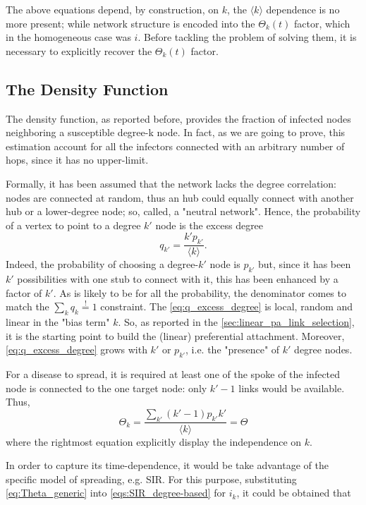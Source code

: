 \documentclass[a4paper,12pt,twoside]{book} %
\theoremstyle{definition}
\begin{document}
The above equations depend, by construction, on $k$, the $\langle k \rangle$ dependence is no more present; while network structure is encoded into the $\Theta_k(t)$ factor, which in the homogeneous case was $i$.
Before tackling the problem of solving them, it is necessary to explicitly recover the $\Theta_k(t)$ factor.

\subsection*{The Density Function}
The density function, as reported before, provides the fraction of infected nodes neighboring a susceptible degree-k node. In fact, as we are going to prove, this estimation account for all the infectors connected with an arbitrary number of hops, since it has no upper-limit. 

Formally, it has been assumed that the network lacks the degree correlation: nodes are connected at random, thus an hub could equally connect with another hub or a lower-degree node; so, called, a "neutral network". Hence, the probability of a vertex to point to a degree $k'$ node is the excess degree
\begin{equation}
	q_{k'} = \frac{k' p_{k'}}{\langle k \rangle}
	\label{eq:q_excess_degree}
	.
\end{equation}
Indeed, the probability of choosing a degree-$k'$ node is $p_{k'}$ but, since it has been $k'$ possibilities with one stub to connect with it, this has been enhanced by a factor of $k'$. As is likely to be for all the probability, the denominator comes to match the $\sum_k q_k \stackrel{!}{=} 1$ constraint.
The \autoref{eq:q_excess_degree} is local, random and linear in the "bias term" $k$. So, as reported in the \autoref{sec:linear_pa_link_selection}, it is the starting point to build the (linear) preferential attachment. Moreover, \autoref{eq:q_excess_degree} grows with $k'$ or $p_{k'}$, i.e. the "presence" of $k'$ degree nodes.

For a disease to spread, it is required at least one of the spoke of the infected node is connected to the one target node: only $k'-1$ links would be available.
Thus,
\begin{equation}
	\Theta_k = \frac{\sum_{k'} (k'-1)p_{k'}k'}{\langle k \rangle} = \Theta
	\label{eq:Theta_generic}
\end{equation}
where the rightmost equation explicitly display the independence on $k$.

In order to capture its time-dependence, it would be take advantage of the specific model of spreading, e.g. SIR. For this purpose, substituting \autoref{eq:Theta_generic} into \autoref{eqs:SIR_degree-based} for $i_k$, it could be obtained that \cite{barabasi::2016networkbook}
\end{document}
